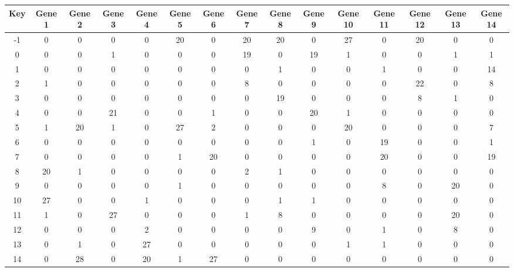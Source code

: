 \begin{tabular}{|c|c|c|c|c|c|c|c|c|c|c|c|c|c|c|}
\hline
Key & Gene 1 & Gene 2 & Gene 3 & Gene 4 & Gene 5 & Gene 6 & Gene 7 & Gene 8 & Gene 9 & Gene 10 & Gene 11 & Gene 12 & Gene 13 & Gene 14 \\
\hline
-1 & 0 & 0 & 0 & 0 & 20 & 0 & 20 & 20 & 0 & 27 & 0 & 20 & 0 & 0 \\
0 & 0 & 0 & 1 & 0 & 0 & 0 & 19 & 0 & 19 & 1 & 0 & 0 & 1 & 1 \\
1 & 0 & 0 & 0 & 0 & 0 & 0 & 0 & 1 & 0 & 0 & 1 & 0 & 0 & 14 \\
2 & 1 & 0 & 0 & 0 & 0 & 0 & 8 & 0 & 0 & 0 & 0 & 22 & 0 & 8 \\
3 & 0 & 0 & 0 & 0 & 0 & 0 & 0 & 19 & 0 & 0 & 0 & 8 & 1 & 0 \\
4 & 0 & 0 & 21 & 0 & 0 & 1 & 0 & 0 & 20 & 1 & 0 & 0 & 0 & 0 \\
5 & 1 & 20 & 1 & 0 & 27 & 2 & 0 & 0 & 0 & 20 & 0 & 0 & 0 & 7 \\
6 & 0 & 0 & 0 & 0 & 0 & 0 & 0 & 0 & 1 & 0 & 19 & 0 & 0 & 1 \\
7 & 0 & 0 & 0 & 0 & 1 & 20 & 0 & 0 & 0 & 0 & 20 & 0 & 0 & 19 \\
8 & 20 & 1 & 0 & 0 & 0 & 0 & 2 & 1 & 0 & 0 & 0 & 0 & 0 & 0 \\
9 & 0 & 0 & 0 & 0 & 1 & 0 & 0 & 0 & 0 & 0 & 8 & 0 & 20 & 0 \\
10 & 27 & 0 & 0 & 1 & 0 & 0 & 0 & 1 & 1 & 0 & 0 & 0 & 0 & 0 \\
11 & 1 & 0 & 27 & 0 & 0 & 0 & 1 & 8 & 0 & 0 & 0 & 0 & 20 & 0 \\
12 & 0 & 0 & 0 & 2 & 0 & 0 & 0 & 0 & 9 & 0 & 1 & 0 & 8 & 0 \\
13 & 0 & 1 & 0 & 27 & 0 & 0 & 0 & 0 & 0 & 1 & 1 & 0 & 0 & 0 \\
14 & 0 & 28 & 0 & 20 & 1 & 27 & 0 & 0 & 0 & 0 & 0 & 0 & 0 & 0 \\
\hline
\end{tabular}